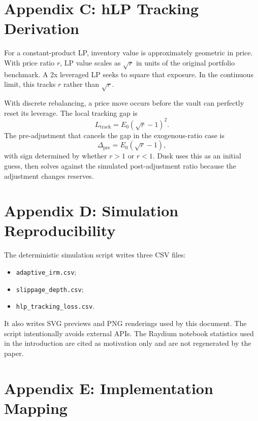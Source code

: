 \documentclass[11pt]{article}
\begin{document}
\section{Appendix C: hLP Tracking Derivation}

For a constant-product LP, inventory value is approximately geometric in price. With price ratio $r$, LP value scales as $\sqrt r$ in units of the original portfolio benchmark. A 2x leveraged LP seeks to square that exposure. In the continuous limit, this tracks $r$ rather than $\sqrt r$.

With discrete rebalancing, a price move occurs before the vault can perfectly reset its leverage. The local tracking gap is
\begin{equation}
L_{\mathrm{track}}=E_0(\sqrt r-1)^2.
\end{equation}
The pre-adjustment that cancels the gap in the exogenous-ratio case is
\begin{equation}
\Delta_{\mathrm{pre}}=E_0(\sqrt r-1),
\end{equation}
with sign determined by whether $r>1$ or $r<1$. Dusk uses this as an initial guess, then solves against the simulated post-adjustment ratio because the adjustment changes reserves.

\section{Appendix D: Simulation Reproducibility}

The deterministic simulation script writes three CSV files:
\begin{itemize}
  \item \texttt{adaptive\_irm.csv};
  \item \texttt{slippage\_depth.csv};
  \item \texttt{hlp\_tracking\_loss.csv}.
\end{itemize}
It also writes SVG previews and PNG renderings used by this document. The script intentionally avoids external APIs. The Raydium notebook statistics used in the introduction are cited as motivation only and are not regenerated by the paper.

\section{Appendix E: Implementation Mapping}
\end{document}
